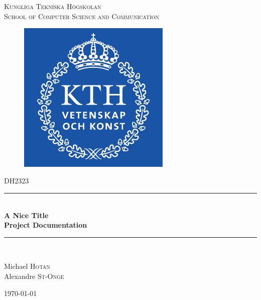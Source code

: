 \documentclass{scrartcl}
\newcommand{\HRule}{\rule{\linewidth}{0.5mm}}
\begin{document}
\lstset{style=sharpc}

\begin{titlepage}
\begin{center}


\textsc{ Kungliga Tekniska Högskolan \\ School of Computer Science and Communication}\\[1.5cm]

\begin{figure}[ht]
\begin{center}
\includegraphics[width=0.65\textwidth]{KTH}
\end{center}
\end{figure}

\textsc{\Large DH2323}\\[0.5cm]

\HRule \\[0.4cm]
 { \huge \bfseries A Nice Title \\[0.4cm] }
{\large \bfseries  Project Documentation\\[0.4cm] }

\HRule \\[1.5cm]

\begin{minipage}{0.65\textwidth}
\begin{flushleft} \large
Michael \textsc{Hotan} \\
Alexandre \textsc{St-Onge}\\
\end{flushleft}
\end{minipage}

\vfill

{\large \today}

\end{center}
\end{titlepage}
\end{document}
